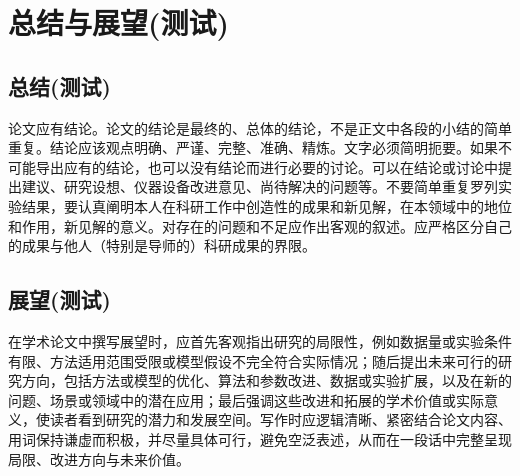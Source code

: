 
\chapter{总结与展望(测试)}

\section{总结(测试)}
论文应有结论。论文的结论是最终的、总体的结论，不是正文中各段的小结的简单重复。结论应该观点明确、严谨、完整、准确、精炼。文字必须简明扼要。如果不可能导出应有的结论，也可以没有结论而进行必要的讨论。可以在结论或讨论中提出建议、研究设想、仪器设备改进意见、尚待解决的问题等。不要简单重复罗列实验结果，要认真阐明本人在科研工作中创造性的成果和新见解，在本领域中的地位和作用，新见解的意义。对存在的问题和不足应作出客观的叙述。应严格区分自己的成果与他人（特别是导师的）科研成果的界限。

\section{展望(测试)}
在学术论文中撰写展望时，应首先客观指出研究的局限性，例如数据量或实验条件有限、方法适用范围受限或模型假设不完全符合实际情况；随后提出未来可行的研究方向，包括方法或模型的优化、算法和参数改进、数据或实验扩展，以及在新的问题、场景或领域中的潜在应用；最后强调这些改进和拓展的学术价值或实际意义，使读者看到研究的潜力和发展空间。写作时应逻辑清晰、紧密结合论文内容、用词保持谦虚而积极，并尽量具体可行，避免空泛表述，从而在一段话中完整呈现局限、改进方向与未来价值。